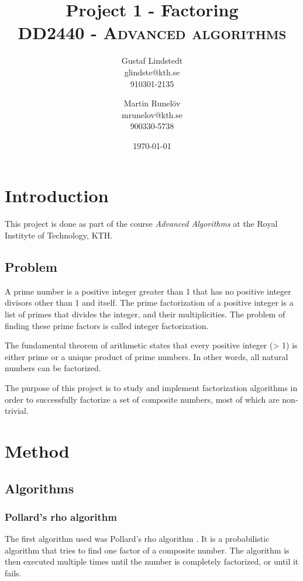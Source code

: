 \documentclass[paper=a4, fontsize=11pt,numbers=endperiod]{scrartcl} %
\title{	
\huge Project 1 - Factoring \\ %
\vspace{10pt}
\normalfont \normalsize 
\textsc{DD2440 - Advanced algorithms } \\ [25pt] %
}
\author{Gustaf Lindstedt \\ glindste@kth.se \\ 910301-2135 \and Martin Runelöv \\ mrunelov@kth.se \\ 900330-5738}
\date{\vspace{8pt}\normalsize\today} %
\numberwithin{equation}{section} %
\numberwithin{figure}{section} %
\numberwithin{table}{section} %
\begin{document}
\maketitle %




\section{Introduction}

This project is done as part of the course \emph{Advanced Algorithms} at the Royal Instityte of Technology, KTH.

\subsection{Problem}
A prime number is a positive integer greater than 1 that has no positive integer divisors other than 1 and itself.
The prime factorization of a positive integer is a list of primes that divides the integer, and their multiplicities.
The problem of finding these prime factors is called integer factorization.

The fundamental theorem of arithmetic states that every positive integer (> 1) is either prime or a unique product of prime numbers.
In other words, all natural numbers can be factorized.

The purpose of this project is to study and implement factorization algorithms in order to successfully factorize a set of composite numbers, most of which are non-trivial.



\section{Method}
\subsection{Algorithms}
\subsubsection{Pollard's rho algorithm}
The first algorithm used was Pollard's rho algorithm \cite{pollard}\cite{algnotes}.
It is a probabilistic algorithm that tries to find one factor of a composite number.
The algorithm is then executed multiple times until the number is completely factorized, or until it fails.
\end{document}
